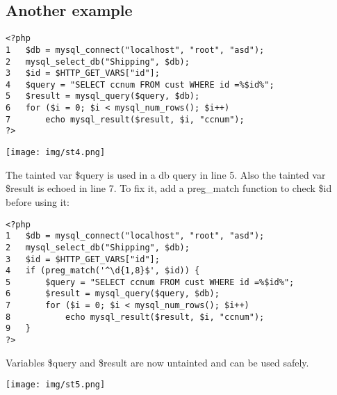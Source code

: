 \documentclass[a4paper, 10pt, titlepage]{article}
\begin{document}
\subsection{Another example}
\begin{lstlisting}
<?php
1 	$db = mysql_connect("localhost", "root", "asd");
2 	mysql_select_db("Shipping", $db);
3 	$id = $HTTP_GET_VARS["id"];
4 	$query = "SELECT ccnum FROM cust WHERE id =%$id%";
5 	$result = mysql_query($query, $db);
6 	for ($i = 0; $i < mysql_num_rows(); $i++)
7		echo mysql_result($result, $i, "ccnum");
?>
\end{lstlisting}
\begin{center}
\texttt{[image: img/st4.png]}
\end{center}
The tainted var \$query is used in a db query in line 5. Also the tainted var \$result is echoed in line 7. To fix it, add a preg\_match function to check \$id before using it:
\begin{lstlisting}
<?php
1 	$db = mysql_connect("localhost", "root", "asd");
2 	mysql_select_db("Shipping", $db);
3 	$id = $HTTP_GET_VARS["id"];
4 	if (preg_match('^\d{1,8}$', $id)) {
5		$query = "SELECT ccnum FROM cust WHERE id =%$id%";
6 		$result = mysql_query($query, $db);
7 		for ($i = 0; $i < mysql_num_rows(); $i++)
8			echo mysql_result($result, $i, "ccnum");
9	}
?>
\end{lstlisting}
Variables \$query and \$result are now untainted and can be used safely.
\begin{center}
\texttt{[image: img/st5.png]}
\end{center}

\newpage
\end{document}
